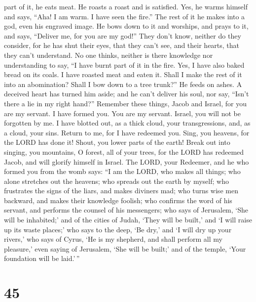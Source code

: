 part of it, he eats meat. He roasts a roast and is satisfied. Yes, he
warms himself and says, ``Aha! I am warm. I have seen the fire.''
 The rest of it he makes into a god, even his engraved
image. He bows down to it and worships, and prays to it, and says,
``Deliver me, for you are my god!''  They don't know,
neither do they consider, for he has shut their eyes, that they can't
see, and their hearts, that they can't understand.  No one
thinks, neither is there knowledge nor understanding to say, ``I have
burnt part of it in the fire. Yes, I have also baked bread on its coals.
I have roasted meat and eaten it. Shall I make the rest of it into an
abomination? Shall I bow down to a tree trunk?''  He feeds
on ashes. A deceived heart has turned him aside; and he can't deliver
his soul, nor say, ``Isn't there a lie in my right hand?'' 
Remember these things, Jacob and Israel, for you are my servant. I have
formed you. You are my servant. Israel, you will not be forgotten by me.
 I have blotted out, as a thick cloud, your transgressions,
and, as a cloud, your sins. Return to me, for I have redeemed you.
 Sing, you heavens, for the LORD has done it! Shout, you
lower parts of the earth! Break out into singing, you mountains, O
forest, all of your trees, for the LORD has redeemed Jacob, and will
glorify himself in Israel.  The LORD, your Redeemer, and he
who formed you from the womb says: ``I am the LORD, who makes all
things; who alone stretches out the heavens; who spreads out the earth
by myself;  who frustrates the signs of the liars, and
makes diviners mad; who turns wise men backward, and makes their
knowledge foolish;  who confirms the word of his servant,
and performs the counsel of his messengers; who says of Jerusalem, `She
will be inhabited;' and of the cities of Judah, `They will be built,'
and `I will raise up its waste places;'  who says to the
deep, `Be dry,' and `I will dry up your rivers,'  who says
of Cyrus, `He is my shepherd, and shall perform all my pleasure,' even
saying of Jerusalem, `She will be built;' and of the temple, `Your
foundation will be laid.'\,''

\hypertarget{section-43}{%
\section{45}\label{section-43}}

